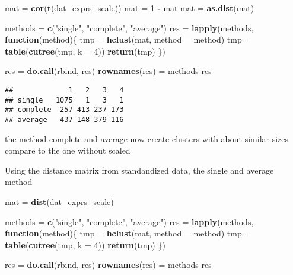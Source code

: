 \documentclass[]{article}
\newenvironment{Shaded}{\begin{snugshade}}{\end{snugshade}}
\newcommand{\KeywordTok}[1]{\textcolor[rgb]{0.13,0.29,0.53}{\textbf{#1}}}
\newcommand{\DataTypeTok}[1]{\textcolor[rgb]{0.13,0.29,0.53}{#1}}
\newcommand{\DecValTok}[1]{\textcolor[rgb]{0.00,0.00,0.81}{#1}}
\newcommand{\StringTok}[1]{\textcolor[rgb]{0.31,0.60,0.02}{#1}}
\newcommand{\ControlFlowTok}[1]{\textcolor[rgb]{0.13,0.29,0.53}{\textbf{#1}}}
\newcommand{\OperatorTok}[1]{\textcolor[rgb]{0.81,0.36,0.00}{\textbf{#1}}}
\newcommand{\NormalTok}[1]{#1}
\begin{document}
\begin{Shaded}
\begin{Highlighting}[]
\NormalTok{mat =}\StringTok{ }\KeywordTok{cor}\NormalTok{(}\KeywordTok{t}\NormalTok{(dat_exprs_scale))}
\NormalTok{mat =}\StringTok{ }\DecValTok{1} \OperatorTok{-}\StringTok{ }\NormalTok{mat}
\NormalTok{mat =}\StringTok{ }\KeywordTok{as.dist}\NormalTok{(mat)}

\NormalTok{methods =}\StringTok{ }\KeywordTok{c}\NormalTok{(}\StringTok{"single"}\NormalTok{, }\StringTok{"complete"}\NormalTok{, }\StringTok{"average"}\NormalTok{)}
\NormalTok{res =}\StringTok{ }\KeywordTok{lapply}\NormalTok{(methods, }\ControlFlowTok{function}\NormalTok{(method)\{}
\NormalTok{    tmp =}\StringTok{ }\KeywordTok{hclust}\NormalTok{(mat, }\DataTypeTok{method =}\NormalTok{ method)}
\NormalTok{    tmp =}\StringTok{ }\KeywordTok{table}\NormalTok{(}\KeywordTok{cutree}\NormalTok{(tmp, }\DataTypeTok{k =} \DecValTok{4}\NormalTok{))}
    \KeywordTok{return}\NormalTok{(tmp)}
\NormalTok{\})}

\NormalTok{res =}\StringTok{ }\KeywordTok{do.call}\NormalTok{(rbind, res)}
\KeywordTok{rownames}\NormalTok{(res) =}\StringTok{ }\NormalTok{methods}
\NormalTok{res}
\end{Highlighting}
\end{Shaded}

\begin{verbatim}
##             1   2   3   4
## single   1075   1   3   1
## complete  257 413 237 173
## average   437 148 379 116
\end{verbatim}

the method complete and average now create clusters with about similar
sizes compare to the one without scaled

Using the distance matrix from standandized data, the single and average
method

\begin{Shaded}
\begin{Highlighting}[]
\NormalTok{mat =}\StringTok{ }\KeywordTok{dist}\NormalTok{(dat_exprs_scale)}

\NormalTok{methods =}\StringTok{ }\KeywordTok{c}\NormalTok{(}\StringTok{"single"}\NormalTok{, }\StringTok{"complete"}\NormalTok{, }\StringTok{"average"}\NormalTok{)}
\NormalTok{res =}\StringTok{ }\KeywordTok{lapply}\NormalTok{(methods, }\ControlFlowTok{function}\NormalTok{(method)\{}
\NormalTok{    tmp =}\StringTok{ }\KeywordTok{hclust}\NormalTok{(mat, }\DataTypeTok{method =}\NormalTok{ method)}
\NormalTok{    tmp =}\StringTok{ }\KeywordTok{table}\NormalTok{(}\KeywordTok{cutree}\NormalTok{(tmp, }\DataTypeTok{k =} \DecValTok{4}\NormalTok{))}
    \KeywordTok{return}\NormalTok{(tmp)}
\NormalTok{\})}

\NormalTok{res =}\StringTok{ }\KeywordTok{do.call}\NormalTok{(rbind, res)}
\KeywordTok{rownames}\NormalTok{(res) =}\StringTok{ }\NormalTok{methods}
\NormalTok{res}
\end{Highlighting}
\end{Shaded}
\end{document}
